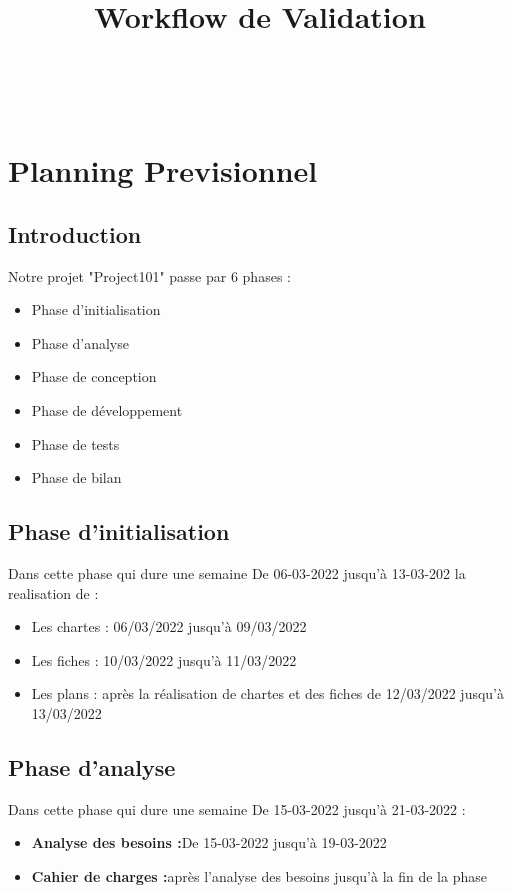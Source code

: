 \documentclass[11pt,fleqn]{book} %
\begin{document}
\title{Workflow de Validation}

\begingroup
{}
\endgroup

\newpage
~\vfill
\thispagestyle{empty}

\pagestyle{empty} %
\tableofcontents
\pagestyle{fancy} %

\chapter{Planning Previsionnel}
\section{Introduction}
Notre projet "Project101" passe par 6 phases :
\begin{itemize}
    \item Phase d’initialisation
    \item Phase d’analyse
    \item Phase de conception
    \item Phase de développement
    \item Phase de tests
    \item Phase de bilan
\end{itemize}

\section{Phase d’initialisation}
Dans cette phase qui dure une semaine De 06-03-2022 jusqu’à 13-03-202 la realisation de :
\begin{itemize}
    \item Les chartes : 06/03/2022 jusqu'à 09/03/2022
        \item Les fiches : 10/03/2022 jusqu'à 11/03/2022
    \item Les plans : après la réalisation de chartes et des fiches de 12/03/2022 jusqu'à 13/03/2022
\end{itemize}


\section{Phase d'analyse}
Dans cette phase qui dure une semaine De 15-03-2022 jusqu’à 21-03-2022 :
\begin{itemize}
    \item \textbf{Analyse des besoins :}De 15-03-2022 jusqu’à 19-03-2022 
    \item \textbf{Cahier de charges :}après l’analyse des besoins jusqu'à la fin de la phase
\end{itemize}
\end{document}
